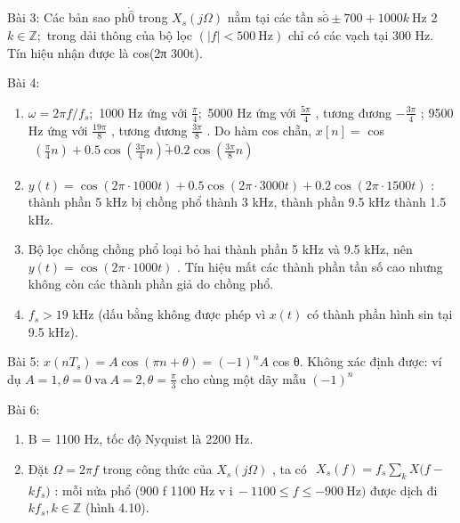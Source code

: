 \documentclass[
  10
]{article}
\begin{document}
Bài 3: Các bản sao \(\mathrm { p h } \mathring { \hat { 0 } }\) trong
\(X _ { s } ( j \Omega )\) nằm tại các tần
\(\mathrm { s } \acute { \hat { \mathrm { o } } } \pm 7 0 0 + 1 0 0 0 k ~ \mathrm { H z }\)
2 \(k \in \mathbb { Z } ;\) trong dải thông của bộ lọc
\(( | f | < 5 0 0 ~ \mathrm { H z } )\) chỉ có các vạch tại 300 Hz. Tín
hiệu nhận được là cos(2π 300t).

Bài 4:

\begin{enumerate}
\def\labelenumi{\alph{enumi}.}
\item
  \(\omega = 2 \pi f / f _ { s } \mathrm { ; }\) 1000 Hz ứng với
  \(\textstyle { \frac { \pi } { 4 } } ;\) 5000 Hz ứng với
  \(\frac { 5 \pi } { 4 }\) , tương đương \(- \frac { 3 \pi } { 4 }\) ;
  9500 Hz ứng với \(\textstyle { \frac { 1 9 \pi } { 8 } }\) , tương
  đương \(\frac { 3 \pi } { 8 }\) . Do hàm cos chẵn, \(x [ n ] =\) cos
  \(\begin{array} { r } { \left( \frac { \pi } { 4 } n \right) + 0 . 5 \cos { \left( \frac { 3 \pi } { 4 } n \right) } \breve { + } 0 . 2 \cos { \left( \frac { 3 \pi } { 8 } n \right) } } \end{array}\)
\item
  \(y ( t ) = \cos ( 2 \pi \cdot 1 0 0 0 t ) + 0 . 5 \cos ( 2 \pi \cdot 3 0 0 0 t ) + 0 . 2 \cos ( 2 \pi \cdot 1 5 0 0 t )\)
  : thành phần 5 kHz bị chồng phổ thành 3 kHz, thành phần 9.5 kHz thành
  1.5 kHz.
\item
  Bộ lọc chống chồng phổ loại bỏ hai thành phần 5 kHz và 9.5 kHz, nên
  \(y ( t ) = \cos ( 2 \pi \cdot 1 0 0 0 t )\) . Tín hiệu mất các thành
  phần tần số cao nhưng không còn các thành phần giả do chồng phổ.
\item
  \(f _ { s } > 1 9\) kHz (dấu bằng không được phép vì \(x ( t )\) có
  thành phần hình sin tại 9.5 kHz).
\end{enumerate}

Bài 5:
\(x ( n T _ { s } ) = A \cos ( \pi n + \theta ) = ( - 1 ) ^ { n } A\)
cos θ. Không xác định được: ví dụ
\(A = 1 , \theta = 0 { \mathrm { ~ v a ~ } } A = 2 , \theta = { \frac { \pi } { 3 } }\)
cho cùng một dãy mẫu \(( - 1 ) ^ { n }\)

Bài 6:

\begin{enumerate}
\def\labelenumi{\alph{enumi}.}
\item
  B = 1100 Hz, tốc độ Nyquist là 2200 Hz.
\item
  Đặt \(\Omega = 2 \pi f\) trong công thức của
  \(X _ { s } ( j \Omega )\) , ta có
  \(\begin{array} { r } { X _ { s } ( f ) = f _ { s } \sum _ { k } X ( f - } \end{array}\)
  \(k f _ { s } )\) : mỗi nửa phổ (900 f 1100 Hz v
  \(\mathrm { i } \ - 1 1 0 0 \leq f \leq - 9 0 0 \ \mathrm { H z } )\)
  được dịch đi \(k f _ { s } , k \in \mathbb { Z }\) (hình 4.10).
\end{enumerate}
\end{document}
